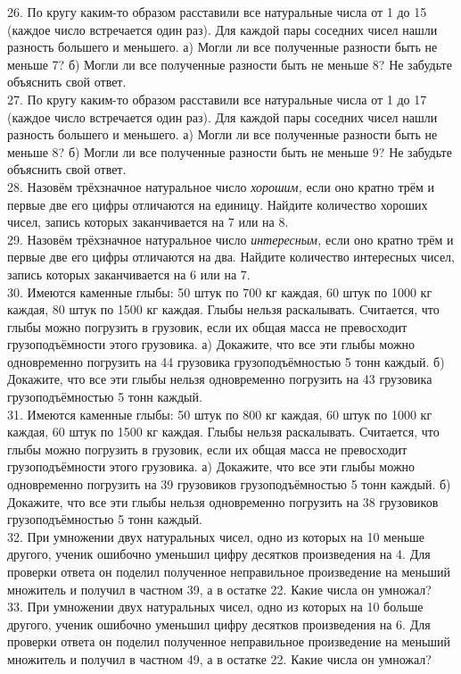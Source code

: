 \documentclass[12pt]{article}
\begin{document}
26. По кругу каким-то образом расставили все натуральные числа от 1 до 15 (каждое число встречается один раз). Для каждой пары соседних чисел нашли разность большего и меньшего. а) Могли ли все полученные разности быть не меньше 7? б) Могли ли все полученные разности быть не меньше 8? Не забудьте объяснить свой ответ.\\
27. По кругу каким-то образом расставили все натуральные числа от 1 до 17 (каждое число встречается один раз). Для каждой пары соседних чисел нашли разность большего и меньшего. а) Могли ли все полученные разности быть не меньше 8? б) Могли ли все полученные разности быть не меньше 9? Не забудьте объяснить свой ответ.\\
28. Назовём трёхзначное натуральное число {\it хорошим,} если оно кратно трём и первые две его цифры отличаются на единицу. Найдите количество хороших чисел, запись которых заканчивается на 7 или на 8.\\
29. Назовём трёхзначное натуральное число {\it интересным,} если оно кратно трём и первые две его цифры отличаются на два. Найдите количество интересных чисел, запись которых заканчивается на 6 или на 7.\\
30. Имеются каменные глыбы: 50 штук по 700 кг каждая, 60 штук по 1000 кг каждая, 80 штук по 1500 кг каждая. Глыбы нельзя раскалывать. Считается, что глыбы можно погрузить в грузовик, если их общая масса не превосходит грузоподъёмности этого грузовика. а) Докажите, что все эти глыбы можно одновременно погрузить на 44 грузовика грузоподъёмностью 5 тонн каждый. б) Докажите, что все эти глыбы нельзя одновременно погрузить на 43 грузовика грузоподъёмностью 5 тонн каждый.\\
31. Имеются каменные глыбы: 50 штук по 800 кг каждая, 60 штук по 1000 кг каждая, 60 штук по 1500 кг каждая. Глыбы нельзя раскалывать. Считается, что глыбы можно погрузить в грузовик, если их общая масса не превосходит грузоподъёмности этого грузовика. а) Докажите, что все эти глыбы можно одновременно погрузить на 39 грузовиков грузоподъёмностью 5 тонн каждый. б) Докажите, что все эти глыбы нельзя одновременно погрузить на 38 грузовиков грузоподъёмностью 5 тонн каждый.\\
32. При умножении двух натуральных чисел, одно из которых на 10 меньше другого, ученик ошибочно уменьшил цифру десятков произведения на 4. Для проверки ответа он поделил полученное неправильное произведение на меньший множитель и получил в частном 39, а в остатке 22. Какие числа он умножал?\\
33. При умножении двух натуральных чисел, одно из которых на 10 больше другого, ученик ошибочно уменьшил цифру десятков произведения на 6. Для проверки ответа он поделил полученное неправильное произведение на меньший множитель и получил в частном 49, а в остатке 22. Какие числа он умножал?\\
\end{document}
